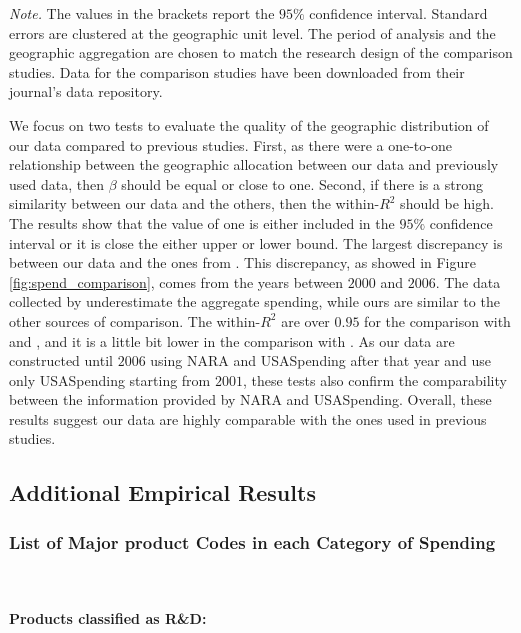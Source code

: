 \documentclass[dv_diss_main.tex]{subfiles}
\begin{document}
\begin{table}[!ht]
\begin{center}
\end{center}
\footnotesize{\textit{Note. } The values in the brackets report the $95\%$ confidence interval. Standard errors are clustered at the geographic unit level. The period of analysis and the geographic aggregation are chosen to match the research design of the comparison studies. Data for the comparison studies have been downloaded from their journal's data repository.}
\end{table} 


We focus on two tests to evaluate the quality of the geographic distribution of our data compared to previous studies. First, as there were a one-to-one relationship between the geographic allocation between our data and previously used data, then $\beta$ should be equal or close to one. Second, if there is a strong similarity between our data and the others, then the within-$R^{2}$ should be high. The results show that the value of one is either included in the $95\%$ confidence interval or it is close the either upper or lower bound. The largest discrepancy is between our data and the ones from \cite{Nakamura2014}. This discrepancy, as showed in Figure \ref{fig:spend_comparison}, comes from the years between $2000$ and $2006$. The data collected by \cite{Nakamura2014} underestimate the aggregate spending, while ours are similar to the other sources of comparison. The within-$R^{2}$ are over $0.95$ for the comparison with \cite{Nakamura2014} and \cite{Dupor2017}, and it is a little bit lower in the comparison with \cite{Demyanyk2019}. As our data are constructed until $2006$ using NARA and USASpending after that year and \cite{Demyanyk2019} use only USASpending starting from $2001$, these tests also confirm the comparability between the information provided by NARA and USASpending. Overall, these results suggest our data are highly comparable with the ones used in previous studies.

\subsection{Additional Empirical Results}\label{sec:app_empres}
\subsubsection{List of Major product Codes in each Category of Spending}\label{tab:cat_list}

\\
\\
\noindent\textbf{Products classified as R\&D: }
\end{document}
